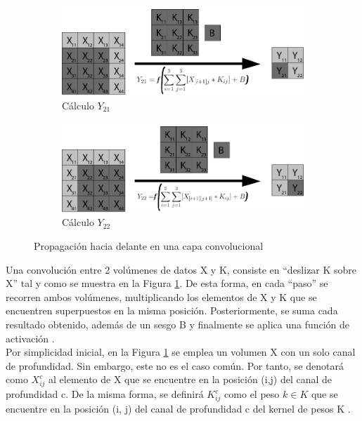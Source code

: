\begin{figure}[H]
	\vspace{5mm}
	\begin{subfigure}{.5\textwidth}
		\hspace{-10mm}
		\includegraphics[width=1.2\linewidth]{imagenes/conv_3.jpg}  
		\caption{Cálculo $Y_{21}$}
	\end{subfigure}%
	\begin{subfigure}{.5\textwidth}
		\hspace{10mm}
		\includegraphics[width=1.2\linewidth]{imagenes/conv_4.jpg}  
		\caption{Cálculo $Y_{22}$}
	\end{subfigure}
	\caption{Propagación hacia delante en una capa convolucional}
	\label{fig:forward_prop_convolucional}
\end{figure}

Una convolución entre 2 volúmenes de datos X y K, consiste en ``deslizar K sobre X'' tal y como se muestra en la Figura \ref{fig:forward_prop_convolucional}. 
De esta forma, en cada ``paso'' se recorren ambos volúmenes, multiplicando los elementos de X y K que se encuentren superpuestos en la misma posición. Posteriormente, se suma cada resultado obtenido, además de un sesgo B y finalmente se aplica una función de activación \cite{capa_convolucional}. \\
Por simplicidad inicial, en la Figura \ref{fig:forward_prop_convolucional} se emplea un volumen X con un solo canal de profundidad. Sin embargo, este no es el caso común. Por tanto, se denotará como $X^{c}_{ij}$ al elemento de X que se encuentre en la posición (i,j) del canal de profundidad c. De la misma forma, se definirá $K^{c}_{ij}$ como el peso $k \in K$ que se encuentre en la posición (i, j) del canal de profundidad c del kernel de pesos K \cite{capa_convolucional_Stanford}.

